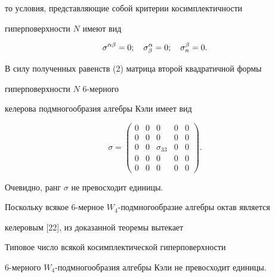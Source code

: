\begin{pf}
то условия, представляющие собой критерии косимплектичности 


гиперповерхности $N$ имеют вид


\begin{equation}


\sigma^{\al\beta}=0;\quad \sigma^\al_\beta=0;


\quad \sigma^\beta_n=0.


\end{equation}





В силу полученных равенств (2) матрица второй квадратичной формы 


гиперповерхности $N$ 6-мерного 


келерова подмногообразия алгебры Кэли имеет вид


\begin{equation}


\sigma=


\begin{pmatrix} 0&0&0&0&0\\


0&0&0&0&0\\


0&0&\sigma_{33}&0&0\\


0&0&0&0&0\\


0&0&0&0&0 \end{pmatrix}.


\end{equation}


Очевидно, ранг $\sigma$ не превосходит единицы.


\end{pf}





Поскольку всякое 6-мерное $W_4$-подмногообразие алгебры октав является


келеровым [22], из доказанной теоремы вытекает





\begin{cornonum}


Типовое число всякой косимплектической гиперповерхности


6-мерного $W_4$-под\-многообразия алгебры Кэли не превосходит единицы.


\end{cornonum}





